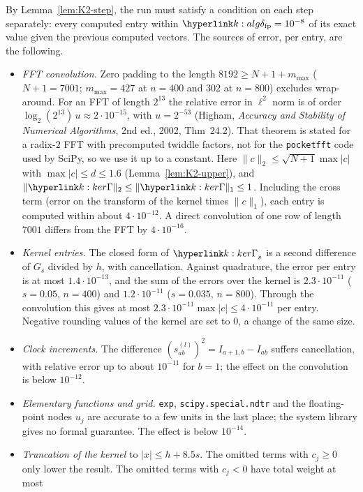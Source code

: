 \documentclass[11pt]{article}
\newcommand{\1}{\mathbf{1}}
\begin{document}
\begin{remark}\label{rem:K2-fp}
By Lemma~\ref{lem:K2-step}, the run must satisfy a condition on each step separately: every computed entry within $\kdfp=10^{-8}$ of its exact value given the previous
computed vectors. The sources of error, per entry, are the following.
\begin{itemize}
\item \emph{FFT convolution.} Zero padding to the length $8192\ge N+1+m_{\max}$ ($N+1=7001$; $m_{\max}=427$ at $n=400$ and $302$ at $n=800$) excludes wrap-around. For an
FFT of length $2^{13}$ the relative error in $\ell^2$ norm is of order $\log_2(2^{13})\,u\approx2\cdot10^{-15}$, with $u=2^{-53}$ (Higham, \emph{Accuracy and Stability of
Numerical Algorithms}, 2nd ed., 2002, Thm~24.2). That theorem is stated for a radix-$2$ FFT with precomputed twiddle factors, not for the \texttt{pocketfft} code used by
SciPy, so we use it up to a constant. Here $\|c\|_2\le\sqrt{N+1}\max|c|$ with $\max|c|\le d\le1.6$ (Lemma~\ref{lem:K2-upper}), and $\|\kGam\|_2\le\|\kGam\|_1\le1$. Including
the cross term (error on the transform of the kernel times $\|c\|_1$), each entry is computed within about $4\cdot10^{-12}$. A direct convolution of one row of length
$7001$ differs from the FFT by $4\cdot10^{-16}$.
\item \emph{Kernel entries.} The closed form of $\kGam_s$ is a second difference of $G_s$ divided by $h$, with cancellation. Against quadrature, the error per entry is at
most $1.4\cdot10^{-13}$, and the sum of the errors over the kernel is $2.3\cdot10^{-11}$ ($s=0.05$, $n=400$) and $1.2\cdot10^{-11}$ ($s=0.035$, $n=800$). Through the
convolution this gives at most $2.3\cdot10^{-11}\max|c|\le4\cdot10^{-11}$ per entry. Negative rounding values of the kernel are set to $0$, a change of the same size.
\item \emph{Clock increments.} The difference $(s^{(l)}_{ab})^2=I_{a+1,b}-I_{ab}$ suffers cancellation, with relative error up to about $10^{-11}$ for $b=1$; the effect on the
convolution is below $10^{-12}$.
\item \emph{Elementary functions and grid.} \texttt{exp}, \texttt{scipy.special.ndtr} and the floating-point nodes $u_j$ are accurate to a few units in the last place; the
system library gives no formal guarantee. The effect is below $10^{-14}$.
\item \emph{Truncation of the kernel} to $|x|\le h+8.5s$. The omitted terms with $c_j\ge0$ only lower the result. The omitted terms with $c_j<0$ have total weight at most

\end{itemize}
\end{remark}
\end{document}
